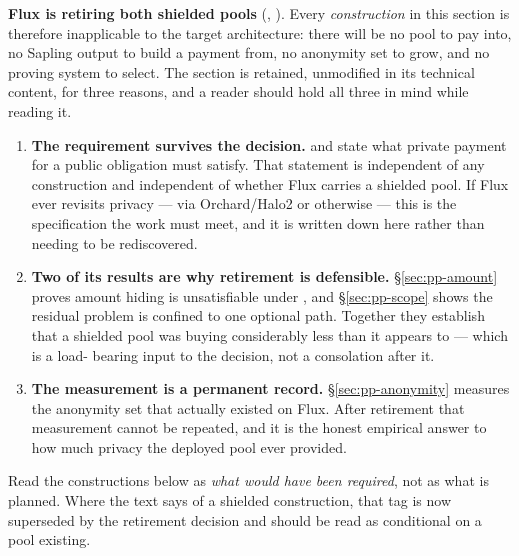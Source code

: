 \begin{remark}
\label{rem:pp-status}
\textbf{Flux is retiring both shielded pools} (,
). Every \emph{construction} in this section is therefore
inapplicable to the target architecture: there will be no pool to pay into, no Sapling output to
build a payment from, no anonymity set to grow, and no proving system to select. The section is
retained, unmodified in its technical content, for three reasons, and a reader should hold all three
in mind while reading it.

\begin{enumerate}
  \item \textbf{The requirement survives the decision.}  and  state what private
  payment for a public obligation must satisfy. That statement is independent of any construction and
  independent of whether Flux carries a shielded pool. If Flux ever revisits privacy --- via
  Orchard/Halo2 or otherwise --- this is the specification the work must meet, and it is written
  down here rather than needing to be rediscovered.
  \item \textbf{Two of its results are why retirement is defensible.}
  \S\ref{sec:pp-amount} proves amount hiding is unsatisfiable under \PNR{}, and
  \S\ref{sec:pp-scope} shows the residual problem is confined to one optional path. Together they
  establish that a shielded pool was buying considerably less than it appears to --- which is a load-
  bearing input to the decision, not a consolation after it.
  \item \textbf{The measurement is a permanent record.} \S\ref{sec:pp-anonymity} measures the
  anonymity set that actually existed on Flux. After retirement that measurement cannot be repeated,
  and it is the honest empirical answer to how much privacy the deployed pool ever provided.
\end{enumerate}

Read the constructions below as \emph{what would have been required}, not as what is planned. Where
the text says \planned{} of a shielded construction, that tag is now superseded by the retirement
decision and should be read as conditional on a pool existing.
\end{remark}

